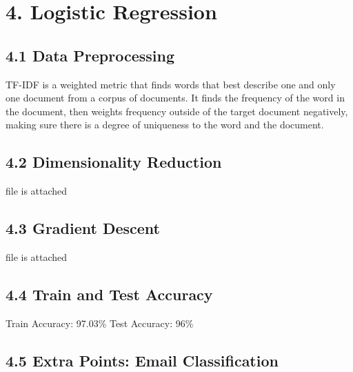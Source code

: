 \documentclass[12pt]{article}
\begin{document}
\section*{4. Logistic Regression}
\subsection*{4.1 Data Preprocessing}

TF-IDF is a weighted metric that finds words that best describe one and only one document from a corpus of documents. It finds the frequency of the word in the document, then weights frequency outside of the target document negatively, making sure there is a degree of uniqueness to the word and the document.

\subsection*{4.2 Dimensionality Reduction}
file is attached

\subsection*{4.3 Gradient Descent}
file is attached

\subsection*{4.4 Train and Test Accuracy}
Train Accuracy: 97.03\%
Test Accuracy: 96\%

\subsection*{4.5 Extra Points: Email Classification}
\end{document}
